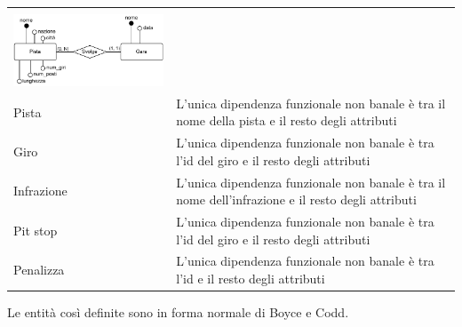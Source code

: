 \documentclass[11pt]{article}
\begin{document}
\begin{center}
\begin{tabular}{ |p{2cm}|p{14.5cm}| }
{{                Si procede quindi a spostare il numero dei giri da Gara in Pista.
            }\\
            \includegraphics[width=8cm]{../er/norm_pista.pdf}
        } \\
        \hline
        Pista & \par{L'unica dipendenza funzionale non banale è tra il nome della pista e il resto degli attributi} \\
        \hline
        Giro & \par{L'unica dipendenza funzionale non banale è tra l'id del giro e il resto degli attributi} \\
        \hline
        Infrazione & \par{L'unica dipendenza funzionale non banale è tra il nome dell'infrazione e il resto degli attributi} \\
        \hline
        Pit stop & \par{L'unica dipendenza funzionale non banale è tra l'id del giro e il resto degli attributi} \\
        \hline
        Penalizza & \par{L'unica dipendenza funzionale non banale è tra l'id e il resto degli attributi} \\
        \hline
    \end{tabular}
\end{center}
Le entità così definite sono in forma normale di Boyce e Codd.
\end{document}
